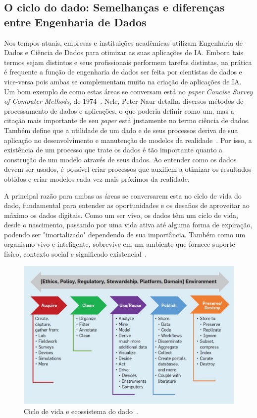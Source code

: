\documentclass[portugues]{ic-tese}
\begin{document}
\subsection{O ciclo do dado: Semelhanças e diferenças entre Engenharia de Dados}

Nos tempos atuais, empresas e instituições acadêmicas utilizam Engenharia de Dados e Ciência de Dados para otimizar as suas aplicações de IA. Embora tais termos sejam distintos e seus profissionais performem tarefas distintas, na prática é frequente a função de engenharia de dados ser feita por cientistas de dados e vice-versa pois ambas se complementam muito na criação de aplicações de IA. Um bom exemplo de como estas áreas se conversam está no \textit{paper} \textit{Concise Survey of Computer Methods}, de 1974~\citep{Panoply_2017}. Nele, Peter Naur detalha diversos métodos de processamento de dados e aplicações, o que poderia definir como um, mas a citação mais importante de seu \textit{paper} está justamente no termo ciência de dados. Também define que a utilidade de um dado e de seus processos deriva de sua aplicação no desenvolvimento e manutenção de modelos da realidade~\citep{Foote_2021}. Por isso, a existência de um processo que trate os dados é tão importante quanto a construção de um modelo através de seus dados. Ao entender como os dados devem ser usados, é possível criar processos que auxiliem a otimizar os resultados obtidos e criar modelos cada vez mais próximos da realidade.

A principal razão para ambas as áreas se conversarem esta no ciclo de vida do dado, fundamental para entender as oportunidades e os desafios de aproveitar ao máximo os dados digitais. Como um ser vivo, os dados têm um ciclo de vida, desde o nascimento, passando por uma vida ativa até alguma forma de expiração, podendo ser "imortalizado" dependendo de sua importância. Também como um organismo vivo e inteligente, sobrevive em um ambiente que fornece suporte físico, contexto social e significado existencial~\citep{Berman_2018}.

\begin{figure}[h]
\centering
\includegraphics[scale=0.6]{images/data_life_cycle.jpg}
\caption {Ciclo de vida e ecossistema do dado~\citep{Berman_2018}.}
\label{fig:cicloDado}
\end{figure}
\end{document}
